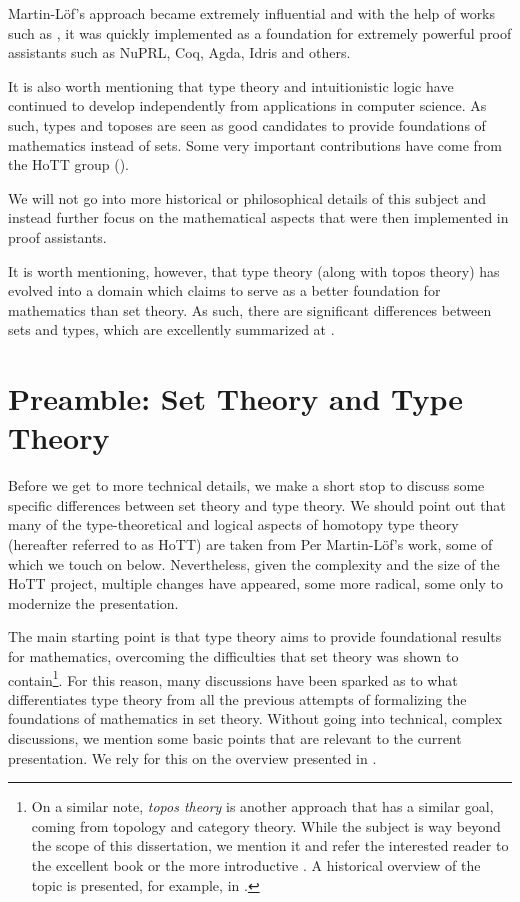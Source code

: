 Martin-L\"of's approach became extremely influential and with the help of
works such as \cite{pmltt}, it was quickly implemented as a foundation for
extremely powerful proof assistants such as NuPRL, Coq, Agda, Idris and others.

It is also worth mentioning that type theory and intuitionistic logic have
continued to develop independently from applications in computer science.
As such, types and toposes are seen as good candidates to provide
 foundations of mathematics instead of sets. Some very important
contributions have come from the HoTT group (\cite{hott}).

We will not go into more historical or philosophical details of this subject
and instead further focus on the mathematical aspects that were then
implemented in proof assistants.

It is worth mentioning, however, that type theory (along with topos theory)
has evolved into a domain which claims to serve as a better foundation for
mathematics than set theory. As such, there are significant differences
between sets and types, which are excellently summarized at
\cite[\S1.1]{hott}.

\section{Preamble: Set Theory and Type Theory}

Before we get to more technical details, we make a short stop to discuss
some specific differences between set theory and type theory. We should point
out that many of the type-theoretical and logical aspects of homotopy type
theory (hereafter referred to as HoTT) are taken from Per Martin-L\"{o}f's
work, some of which we touch on below.
Nevertheless, given the complexity and the size of the HoTT project, multiple
changes have appeared, some more radical, some only to modernize the
presentation.

The main starting point is that type theory aims to provide foundational
results for mathematics, overcoming the difficulties that set theory was shown
to contain\footnote{On a similar note, \emph{topos theory} is another approach
  that has a similar goal, coming from topology and category theory. While the
  subject is way beyond the scope of this dissertation, we mention it and refer
  the interested reader to the excellent book \cite{macsh} or the more introductive
  \cite{goldb}. A historical overview of the topic is presented, for example,
  in \cite{abuse}.}. For this reason, many discussions have been sparked as to
what differentiates type theory from all the previous attempts of formalizing the
foundations of mathematics in set theory. Without going into technical,
complex discussions, we mention some basic points that are relevant to the
current presentation. We rely for this on the overview presented in
\cite[\S 1.1]{hott}.

